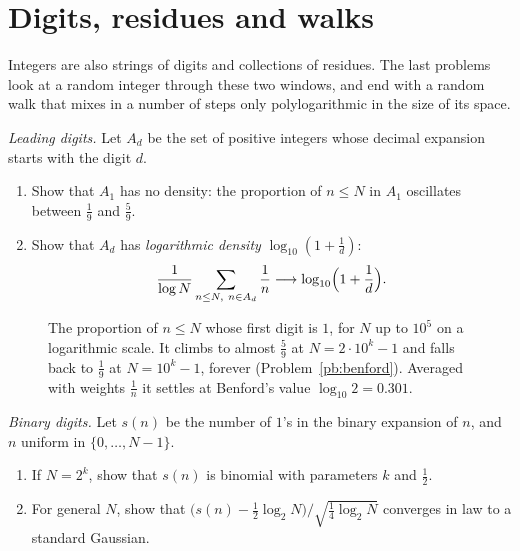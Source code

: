 \section{Digits, residues and walks}

Integers are also strings of digits and collections of residues. The last problems look at a random integer through these
two windows, and end with a random walk that mixes in a number of steps only polylogarithmic in the size of its space.

\begin{exercise}[$\star\star$]\label{pb:benford}
\emph{Leading digits.} Let $A_d$ be the set of positive integers whose decimal expansion starts with the digit $d$.
\begin{enumerate}[label=(\alph*)]
\item Show that $A_1$ has no density: the proportion of $n\le N$ in $A_1$ oscillates between $\frac19$ and $\frac59$.
\item Show that $A_d$ has \emph{logarithmic density} $\log_{10}(1+\frac1d)$:
\[
\frac1{\log N}\sum_{n\le N,\ n\in A_d}\frac1n\longrightarrow\log_{10}\Bigl(1+\frac1d\Bigr).
\]
\end{enumerate}
\end{exercise}

\begin{figure}[ht]
\centering
{}
\caption{The proportion of $n\le N$ whose first digit is $1$, for $N$ up to $10^5$ on a logarithmic scale. It climbs to almost
$\frac59$ at $N=2\cdot10^k-1$ and falls back to $\frac19$ at $N=10^k-1$, forever (Problem~\ref{pb:benford}). Averaged with weights
$\frac1n$ it settles at Benford's value $\log_{10}2=0.301$.}
\label{fig:benford}
\end{figure}

\begin{exercise}[$\star\star$]\label{pb:digitsclt}
\emph{Binary digits.} Let $s(n)$ be the number of $1$'s in the binary expansion of $n$, and $n$ uniform in $\{0,\dots,N-1\}$.
\begin{enumerate}[label=(\alph*)]
\item If $N=2^k$, show that $s(n)$ is binomial with parameters $k$ and $\frac12$.
\item For general $N$, show that $\bigl(s(n)-\frac12\log_2N\bigr)/\sqrt{\frac14\log_2N}$ converges in law to a standard Gaussian.
\end{enumerate}
\end{exercise}

